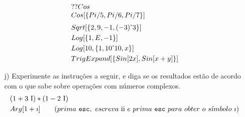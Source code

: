 \documentclass[11pt]{article}
\begin{document}
\begin{itemize}
\[\begin{array}{l}
 \\ 
 
 ??Cos 
 
 \\ 
 
 Cos[\{Pi/5,Pi/6,Pi/7\}] 
 



\vspace{2mm}
\\

Sqrt[\{2, 9, -1, (-3)\,\hat{}\, 3\}]

\vspace{1mm}
\\

Log[\{1, E,-1\}]

\vspace{1mm}
\\

Log[10, \{1, 10\,\hat{}\, 10, x\}]

\vspace{1mm}
\\

TrigExpand[\{Sin[2 x], Sin[x + y]
\}]

 \end{array}
\]


\item[j)] Experimente  as instru\c{c}\~oes a seguir, e diga  se os resultados est\~ao de acordo com o que sabe sobre opera\c{c}\~oes com n\'umeros complexos.
 \[\begin{array}{l}



(1 + 3\ \textup{I})\ast (1 - 2\ \textup{I})

\vspace{1mm}
\\




Arg[1 + \imath ]  \qquad ( prima \ \texttt{esc}, \ escreva \ {\rm ii} \ e \ prima \ \texttt{esc} \ para \ obter \ o \ s\acute{\imath}mbolo \ \imath)


\vspace{1mm}
\\


\end{array}\]
\end{itemize}
\end{document}
